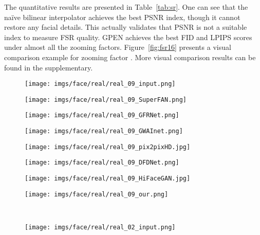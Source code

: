 \documentclass[final]{cvpr}
\begin{document}
The quantitative results are presented in Table~\ref{tab:sr}. One can see that the naïve bilinear interpolator achieves the best PSNR index, though it cannot restore any facial details. This actually validates that PSNR is not a suitable index to measure FSR quality. GPEN achieves the best FID and LPIPS scores under almost all the zooming factors. Figure~\ref{fig:fsr16} presents a visual comparison example for zooming factor . More visual comparison results can be found in the supplementary.






\begin{figure*}[t!]
\centering
    \begin{subfigure}[t!]{.12\textwidth}
        \texttt{[image: imgs/face/real/real\_09\_input.png]}
    \end{subfigure}
    \begin{subfigure}[t!]{.12\textwidth}
        \texttt{[image: imgs/face/real/real\_09\_SuperFAN.png]}
    \end{subfigure}
    \begin{subfigure}[t!]{.12\textwidth}
        \texttt{[image: imgs/face/real/real\_09\_GFRNet.png]}
    \end{subfigure}
    \begin{subfigure}[t!]{.12\textwidth}
        \texttt{[image: imgs/face/real/real\_09\_GWAInet.png]}
    \end{subfigure}
    \begin{subfigure}[t!]{.12\textwidth}
        \texttt{[image: imgs/face/real/real\_09\_pix2pixHD.jpg]}
    \end{subfigure}
    \begin{subfigure}[t!]{.12\textwidth}
        \texttt{[image: imgs/face/real/real\_09\_DFDNet.png]}
    \end{subfigure}
    \begin{subfigure}[t!]{.12\textwidth}
        \texttt{[image: imgs/face/real/real\_09\_HiFaceGAN.jpg]}
    \end{subfigure}
    \begin{subfigure}[t!]{.12\textwidth}
        \texttt{[image: imgs/face/real/real\_09\_our.png]}
    \end{subfigure}
    \\
    \begin{subfigure}[t!]{.12\textwidth}
        \texttt{[image: imgs/face/real/real\_02\_input.png]}

\end{subfigure}
\end{figure*}
\end{document}
